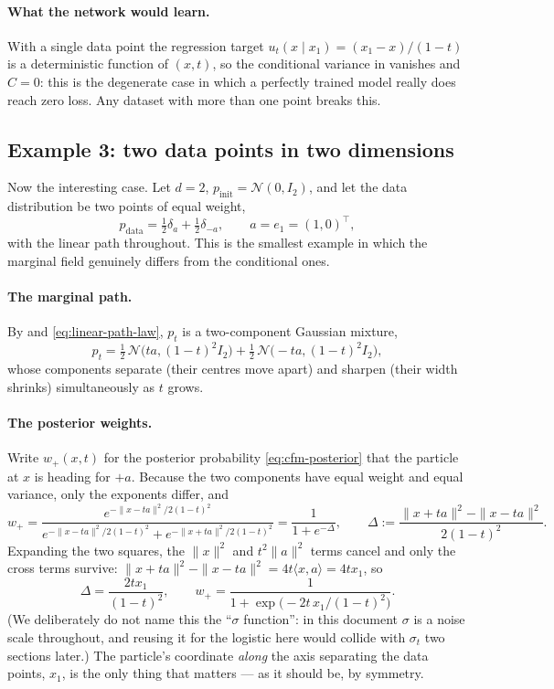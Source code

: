 \documentclass[11pt,a4paper]{report}
\theoremstyle{definition}
\theoremstyle{remark}
\begin{document}
\paragraph{What the network would learn.} With a single data point the
regression target $u_t(x\mid x_1)=(x_1-x)/(1-t)$ is a deterministic
function of $(x,t)$, so the conditional variance in
 vanishes and $C=0$: this is the degenerate case in
which a perfectly trained model really does reach zero loss. Any dataset
with more than one point breaks this.

\subsection{Example 3: two data points in two dimensions}
\label{sec:two-point-2d}

Now the interesting case. Let $d=2$,
$p_{\mathrm{init}}=\mathcal N(0,I_2)$, and let the data distribution be two
points of equal weight,
\[
p_{\mathrm{data}} = \tfrac12\delta_{a} + \tfrac12\delta_{-a},
\qquad a = e_1 = (1,0)^\top ,
\]
with the linear path throughout. This is the smallest example in which the
marginal field genuinely differs from the conditional ones.

\paragraph{The marginal path.} By  and
\eqref{eq:linear-path-law}, $p_t$ is a two-component Gaussian mixture,
\[
p_t = \tfrac12\,\mathcal N\bigl(ta,(1-t)^2I_2\bigr)
    + \tfrac12\,\mathcal N\bigl(-ta,(1-t)^2I_2\bigr) ,
\]
whose components separate (their centres move apart) and sharpen (their
width shrinks) simultaneously as $t$ grows.

\paragraph{The posterior weights.} Write $w_+(x,t)$ for the posterior
probability \eqref{eq:cfm-posterior} that the particle at $x$ is heading
for $+a$. Because the two components have equal weight and equal variance,
only the exponents differ, and
\[
w_+ = \frac{e^{-\|x-ta\|^2/2(1-t)^2}}
           {e^{-\|x-ta\|^2/2(1-t)^2}+e^{-\|x+ta\|^2/2(1-t)^2}}
    = \frac{1}{1+e^{-\Delta}},
\qquad
\Delta := \frac{\|x+ta\|^2-\|x-ta\|^2}{2(1-t)^2} .
\]
Expanding the two squares, the $\|x\|^2$ and $t^2\|a\|^2$ terms cancel and
only the cross terms survive:
$\|x+ta\|^2-\|x-ta\|^2 = 4t\langle x,a\rangle = 4tx_1$, so
\[
\Delta = \frac{2tx_1}{(1-t)^2},
\qquad
w_+ = \frac{1}{1+\exp\bigl(-2t\,x_1/(1-t)^2\bigr)} .
\]
(We deliberately do not name this the ``$\sigma$ function'': in this
document $\sigma$ is a noise scale throughout, and reusing it for the
logistic here would collide with $\sigma_t$ two sections later.)
The particle's coordinate
\emph{along} the axis separating the data points, $x_1$, is the only thing
that matters --- as it should be, by symmetry.
\end{document}
